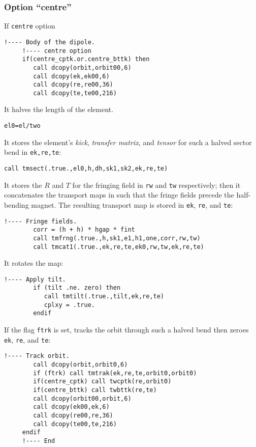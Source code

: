\documentclass{cern-art} %
\begin{document}
\subsubsection{Option ``centre''}
If \lstinline[firstnumber=last]{centre} option
   \begin{lstlisting}[firstnumber=last]
     !---- Body of the dipole.
     !---- centre option
     if(centre_cptk.or.centre_bttk) then
        call dcopy(orbit,orbit00,6)
        call dcopy(ek,ek00,6)
        call dcopy(re,re00,36)
        call dcopy(te,te00,216)
  \end{lstlisting}
It halves the length of the element.
   \begin{lstlisting}[firstnumber=last]
        el0=el/two
\end{lstlisting}
It stores the element's \textit{kick}, \textit{transfer matrix}, and \textit{tensor} for such a halved sector bend in \lstinline[firstnumber=last]{ek,re,te}:
\begin{lstlisting}[firstnumber=last]
        call tmsect(.true.,el0,h,dh,sk1,sk2,ek,re,te)
\end{lstlisting}
It stores the $R$ and $T$ for the fringing field in \lstinline[firstnumber=last]{rw} and \lstinline[firstnumber=last]{tw} respectively; then it concatenates the transport maps in such that the fringe fields precede the half-bending magnet. The resulting transport map is stored in   \lstinline[firstnumber=last]{ek},  \lstinline[firstnumber=last]{re}, and \lstinline[firstnumber=last]{te}:
\begin{lstlisting}[firstnumber=last]
        !---- Fringe fields.
        corr = (h + h) * hgap * fint
        call tmfrng(.true.,h,sk1,e1,h1,one,corr,rw,tw)
        call tmcat1(.true.,ek,re,te,ek0,rw,tw,ek,re,te)
\end{lstlisting}
It rotates the map:
\begin{lstlisting}[firstnumber=last]
        !---- Apply tilt.
        if (tilt .ne. zero) then
           call tmtilt(.true.,tilt,ek,re,te)
           cplxy = .true.
        endif
\end{lstlisting}
If the flag \lstinline[firstnumber=last]{ftrk} is set, tracks the orbit through such a halved bend then zeroes \lstinline[firstnumber=last]{ek},  \lstinline[firstnumber=last]{re}, and \lstinline[firstnumber=last]{te}:
\begin{lstlisting}[firstnumber=last]
        !---- Track orbit.
        call dcopy(orbit,orbit0,6)
        if (ftrk) call tmtrak(ek,re,te,orbit0,orbit0)
        if(centre_cptk) call twcptk(re,orbit0)
        if(centre_bttk) call twbttk(re,te)
        call dcopy(orbit00,orbit,6)
        call dcopy(ek00,ek,6)
        call dcopy(re00,re,36)
        call dcopy(te00,te,216)
     endif
     !---- End
  \end{lstlisting}
\end{document}
